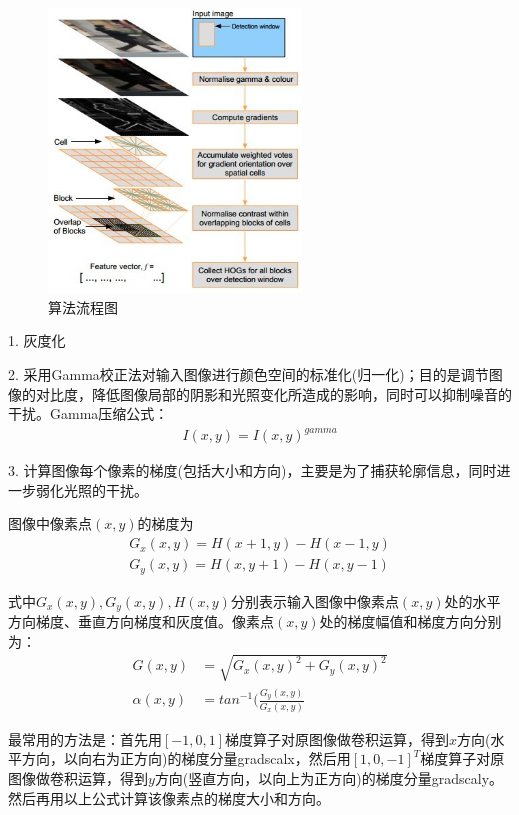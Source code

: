 \documentclass[12pt]{article}
\begin{document}
\begin{figure}[!ht]
\centering
\includegraphics[width=0.6\textwidth]{HOG.png}
\caption{算法流程图}
\label{fig: HOG}
\end{figure} 

1. 灰度化

2. 采用Gamma校正法对输入图像进行颜色空间的标准化(归一化)；目的是调节图像的对比度，降低图像局部的阴影和光照变化所造成的影响，同时可以抑制噪音的干扰。Gamma压缩公式：
\begin{align}
I(x, y) = I(x, y)^{gamma}
\end{align}

3. 计算图像每个像素的梯度(包括大小和方向)，主要是为了捕获轮廓信息，同时进一步弱化光照的干扰。

图像中像素点$(x, y)$的梯度为
\begin{align}
G_x(x, y) = H(x+1, y) - H(x-1, y) \\
G_y(x, y) = H(x, y+1) - H(x, y-1)
\end{align}

式中$G_x(x, y), G_y(x, y), H(x, y)$分别表示输入图像中像素点$(x, y)$处的水平方向梯度、垂直方向梯度和灰度值。像素点$(x, y)$处的梯度幅值和梯度方向分别为：
\begin{align}
G(x, y) & = \sqrt{G_x(x, y)^2 + G_y(x, y)^2}\\
\alpha(x, y) & = tan^{-1}(\frac{G_y(x, y)}{G_x(x, y)}
\end{align}

最常用的方法是：首先用$[-1, 0, 1]$梯度算子对原图像做卷积运算，得到$x$方向(水平方向，以向右为正方向)的梯度分量gradscalx，然后用$[1, 0, -1]^T$梯度算子对原图像做卷积运算，得到$y$方向(竖直方向，以向上为正方向)的梯度分量gradscaly。然后再用以上公式计算该像素点的梯度大小和方向。
\end{document}
